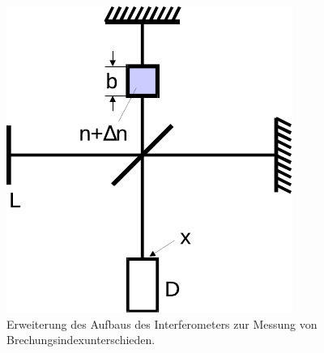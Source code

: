     \begin{figure}
        \centering
        \includegraphics{content/img/Abb_5.pdf}
        \caption{Erweiterung des Aufbaus des Interferometers zur Messung von Brechungsindexunterschieden.}
    \end{figure}

